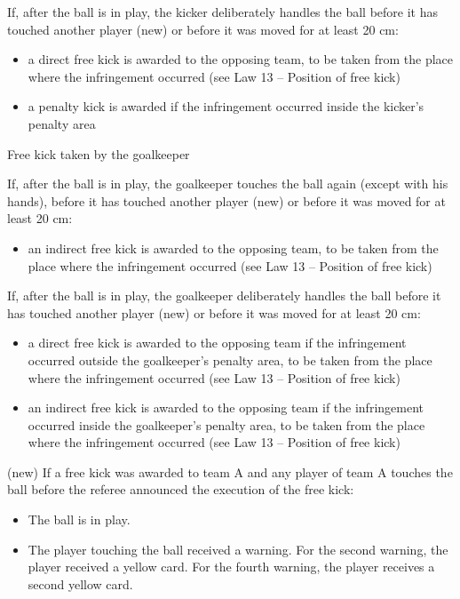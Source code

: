 {\bigskip

If, after the ball is in play, the kicker deliberately handles the ball before it has touched another player (new) or before it was moved for at least 20 cm:

\begin{itemize}
\item a direct free kick is awarded to the opposing team, to be taken from the place where the infringement occurred (see Law 13 -- Position of free kick)
\item a penalty kick is awarded if the infringement occurred inside the kicker's penalty area
\end{itemize}

\bigskip

Free kick taken by the goalkeeper

If, after the ball is in play, the goalkeeper touches the ball again (except with his hands), before it has touched another player (new) or before it was moved for at least 20 cm:

\begin{itemize}
\item an indirect free kick is awarded to the opposing team, to be taken from the place where the infringement occurred (see Law 13 -- Position of free kick)
\end{itemize}

\bigskip

If, after the ball is in play, the goalkeeper deliberately handles the ball before it has touched another player (new) or before it was moved for at least 20 cm:

\begin{itemize}
\item a direct free kick is awarded to the opposing team if the infringement occurred outside the goalkeeper's penalty area, to be taken from the place where the infringement occurred (see Law 13 -- Position of free kick)
\item an indirect free kick is awarded to the opposing team if the infringement occurred inside the goalkeeper's penalty area, to be taken from the place where the infringement occurred (see Law 13 -- Position of free kick)
\end{itemize}

\bigskip

(new) If a free kick was awarded to team A and any player of team A touches the ball before the referee announced the execution of the free kick:

\begin{itemize}
\item The ball is in play.
\item The player touching the ball received a warning. For the second warning, the player received a yellow card. For the fourth warning, the player receives a second yellow card.
\end{itemize}

}
